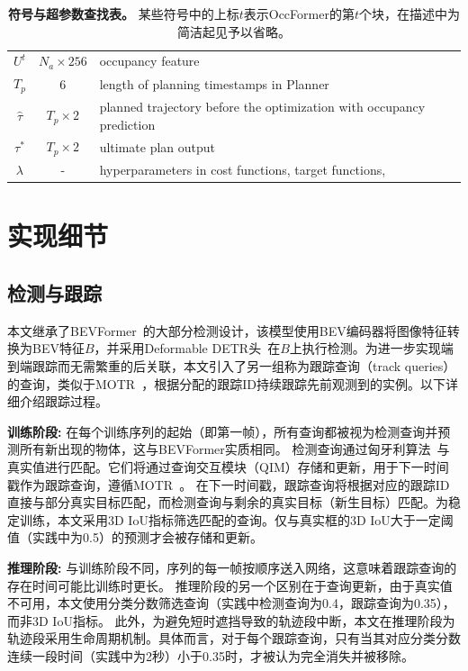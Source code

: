 \documentclass[10pt,twocolumn,letterpaper]{article}
\begin{document}
\begin{table}
\begin{center}
\begin{tabular}{ccl}
				$U^t$ & $N_{a} \times 256$ &occupancy feature\\
    		$T_p$ & 6 &length of planning timestamps in Planner \\
				$\hat{\tau}$ & $T_p \times 2$ &planned trajectory before the optimization with occupancy prediction \\
				$\tau^*$ & $T_p \times 2 $&ultimate plan output \\
				$\lambda$ & - &hyperparameters in cost functions, target functions, \etc \\
				\bottomrule

			\end{tabular}
	\end{center}
	\vspace{8pt}
	\caption{\textbf{符号与超参数查找表。} 某些符号中的上标$t$表示OccFormer的第$t$个块，在描述中为简洁起见予以省略。}
	\label{tab:notation}
\end{table} 

\section{实现细节}
\label{sec:imp-detail}

\subsection{检测与跟踪}
\label{sec:detail-track}

本文继承了BEVFormer~\cite{li2022bevformer}的大部分检测设计，该模型使用BEV编码器将图像特征转换为BEV特征$B$，并采用Deformable DETR头~\cite{zhu2020deformabledetr}在$B$上执行检测。为进一步实现端到端跟踪而无需繁重的后关联，本文引入了另一组称为跟踪查询（track queries）的查询，类似于MOTR~\cite{zeng2021motr}，根据分配的跟踪ID持续跟踪先前观测到的实例。以下详细介绍跟踪过程。

\textbf{训练阶段:}
在每个训练序列的起始（即第一帧），所有查询都被视为检测查询并预测所有新出现的物体，这与BEVFormer实质相同。
%
检测查询通过匈牙利算法~\cite{carion2020detr}与真实值进行匹配。它们将通过查询交互模块（QIM）存储和更新，用于下一时间戳作为跟踪查询，遵循MOTR~\cite{zeng2021motr}。
%
在下一时间戳，跟踪查询将根据对应的跟踪ID直接与部分真实目标匹配，而检测查询与剩余的真实目标（新生目标）匹配。为稳定训练，本文采用3D IoU指标筛选匹配的查询。仅与真实框的3D IoU大于一定阈值（实践中为0.5）的预测才会被存储和更新。

\textbf{推理阶段:}
与训练阶段不同，序列的每一帧按顺序送入网络，这意味着跟踪查询的存在时间可能比训练时更长。
%
推理阶段的另一个区别在于查询更新，由于真实值不可用，本文使用分类分数筛选查询（实践中检测查询为0.4，跟踪查询为0.35），而非3D IoU指标。
%
此外，为避免短时遮挡导致的轨迹段中断，本文在推理阶段为轨迹段采用生命周期机制。具体而言，对于每个跟踪查询，只有当其对应分类分数连续一段时间（实践中为2秒）小于0.35时，才被认为完全消失并被移除。
\end{document}
